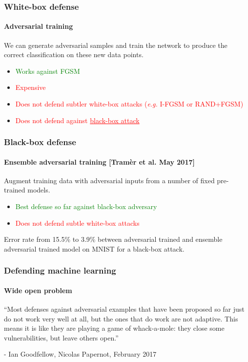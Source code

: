 \documentclass[9pt]{beamer}
\begin{document}
\begin{frame}
  \frametitle{White-box defense}

  \framesubtitle{Adversarial training}

  We can generate adversarial samples and train the network to produce
  the correct classification on these new data points.

  \medskip

  \begin{itemize}
  \item \textcolor{green}{Works against FGSM}
  \item \textcolor{red}{Expensive}
  \item \textcolor{red}{Does not defend subtler white-box
    attacks (\textit{e.g.} I-FGSM or RAND+FGSM)}
  \item \textcolor{red}{Does not defend against \underline{black-box
      attack}}
  \end{itemize}
\end{frame}

\begin{frame}
  \frametitle{Black-box defense}

  \framesubtitle{Ensemble adversarial training [Tramèr et al. May 2017]}

  Augment training data with adversarial inputs from a number of fixed
  pre-trained models.

  \medskip

  \begin{itemize}
  \item \textcolor{green}{Best defense so far against black-box
    adversary}
  \item \textcolor{red}{Does not defend subtle white-box attacks}
  \end{itemize}

  \medskip

  Error rate from 15.5\% to 3.9\% between adversarial trained and
  ensemble adversarial trained model on MNIST for a black-box attack.
\end{frame}

\begin{frame}

  \frametitle{Defending machine learning}

  \framesubtitle{Wide open problem}

  ``Most defenses against adversarial examples that have been proposed
  so far just do not work very well at all, but the ones that do work
  are not adaptive. This means it is like they are playing a game of
  whack-a-mole: they close some vulnerabilities, but leave others
  open.''

  \bigskip

  - Ian Goodfellow, Nicolas Papernot, February 2017
\end{frame}
\end{document}
